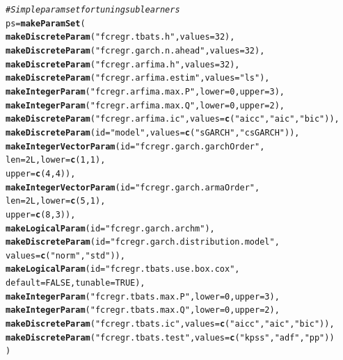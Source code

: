 \documentclass{article}\usepackage[]{graphicx}\usepackage[]{color}
\makeatletter
\newcommand{\hlnum}[1]{\textcolor[rgb]{0.686,0.059,0.569}{#1}}%
\newcommand{\hlstr}[1]{\textcolor[rgb]{0.192,0.494,0.8}{#1}}%
\newcommand{\hlcom}[1]{\textcolor[rgb]{0.678,0.584,0.686}{\textit{#1}}}%
\newcommand{\hlstd}[1]{\textcolor[rgb]{0.345,0.345,0.345}{#1}}%
\newcommand{\hlkwb}[1]{\textcolor[rgb]{0.69,0.353,0.396}{#1}}%
\newcommand{\hlkwc}[1]{\textcolor[rgb]{0.333,0.667,0.333}{#1}}%
\newcommand{\hlkwd}[1]{\textcolor[rgb]{0.737,0.353,0.396}{\textbf{#1}}}%
\newenvironment{kframe}{%
 \def\at@end@of@kframe{}%
 \ifinner\ifhmode%
  \def\at@end@of@kframe{\end{minipage}}%
  \begin{minipage}{\columnwidth}%
 \fi\fi%
 \def\FrameCommand##1{\hskip\@totalleftmargin \hskip-\fboxsep
 \colorbox{shadecolor}{##1}\hskip-\fboxsep
     \hskip-\linewidth \hskip-\@totalleftmargin \hskip\columnwidth}%
 \MakeFramed {\advance\hsize-\width
   \@totalleftmargin\z@ \linewidth\hsize
   \@setminipage}}%
 {\par\unskip\endMakeFramed%
 \at@end@of@kframe}
\newenvironment{knitrout}{}{} %
\theoremstyle{definition}
\makeatother
\begin{document}
\begin{knitrout}
\begin{kframe}
\begin{alltt}
\hlcom{# Simple param set for tuning sub learners}
\hlstd{ps} \hlkwb{=} \hlkwd{makeParamSet}\hlstd{(}
  \hlkwd{makeDiscreteParam}\hlstd{(}\hlstr{"fcregr.tbats.h"}\hlstd{,} \hlkwc{values} \hlstd{=} \hlnum{32}\hlstd{),}
  \hlkwd{makeDiscreteParam}\hlstd{(}\hlstr{"fcregr.garch.n.ahead"}\hlstd{,} \hlkwc{values} \hlstd{=} \hlnum{32}\hlstd{),}
  \hlkwd{makeDiscreteParam}\hlstd{(}\hlstr{"fcregr.arfima.h"}\hlstd{,} \hlkwc{values} \hlstd{=} \hlnum{32}\hlstd{),}
  \hlkwd{makeDiscreteParam}\hlstd{(}\hlstr{"fcregr.arfima.estim"}\hlstd{,} \hlkwc{values} \hlstd{=} \hlstr{"ls"}\hlstd{),}
  \hlkwd{makeIntegerParam}\hlstd{(}\hlstr{"fcregr.arfima.max.P"}\hlstd{,} \hlkwc{lower} \hlstd{=} \hlnum{0}\hlstd{,} \hlkwc{upper} \hlstd{=} \hlnum{3}\hlstd{),}
  \hlkwd{makeIntegerParam}\hlstd{(}\hlstr{"fcregr.arfima.max.Q"}\hlstd{,} \hlkwc{lower} \hlstd{=} \hlnum{0}\hlstd{,} \hlkwc{upper} \hlstd{=} \hlnum{2}\hlstd{),}
  \hlkwd{makeDiscreteParam}\hlstd{(}\hlstr{"fcregr.arfima.ic"}\hlstd{,} \hlkwc{values} \hlstd{=} \hlkwd{c}\hlstd{(}\hlstr{"aicc"}\hlstd{,}\hlstr{"aic"}\hlstd{,}\hlstr{"bic"}\hlstd{)),}
  \hlkwd{makeDiscreteParam}\hlstd{(}\hlkwc{id} \hlstd{=} \hlstr{"model"}\hlstd{,} \hlkwc{values} \hlstd{=} \hlkwd{c}\hlstd{(}\hlstr{"sGARCH"}\hlstd{,} \hlstr{"csGARCH"}\hlstd{)),}
  \hlkwd{makeIntegerVectorParam}\hlstd{(}\hlkwc{id} \hlstd{=} \hlstr{"fcregr.garch.garchOrder"}\hlstd{,}
                         \hlkwc{len} \hlstd{=} \hlnum{2L}\hlstd{,} \hlkwc{lower} \hlstd{=} \hlkwd{c}\hlstd{(}\hlnum{1}\hlstd{,}\hlnum{1}\hlstd{),}
                         \hlkwc{upper} \hlstd{=} \hlkwd{c}\hlstd{(}\hlnum{4}\hlstd{,}\hlnum{4}\hlstd{)),}
  \hlkwd{makeIntegerVectorParam}\hlstd{(}\hlkwc{id} \hlstd{=} \hlstr{"fcregr.garch.armaOrder"}\hlstd{,}
                         \hlkwc{len} \hlstd{=} \hlnum{2L}\hlstd{,} \hlkwc{lower} \hlstd{=} \hlkwd{c}\hlstd{(}\hlnum{5}\hlstd{,}\hlnum{1}\hlstd{),}
                         \hlkwc{upper} \hlstd{=} \hlkwd{c}\hlstd{(}\hlnum{8}\hlstd{,}\hlnum{3}\hlstd{)),}
  \hlkwd{makeLogicalParam}\hlstd{(}\hlkwc{id} \hlstd{=} \hlstr{"fcregr.garch.archm"}\hlstd{),}
  \hlkwd{makeDiscreteParam}\hlstd{(}\hlkwc{id} \hlstd{=} \hlstr{"fcregr.garch.distribution.model"}\hlstd{,}
                    \hlkwc{values} \hlstd{=} \hlkwd{c}\hlstd{(}\hlstr{"norm"}\hlstd{,}\hlstr{"std"}\hlstd{)),}
  \hlkwd{makeLogicalParam}\hlstd{(}\hlkwc{id} \hlstd{=} \hlstr{"fcregr.tbats.use.box.cox"}\hlstd{,}
                                \hlkwc{default} \hlstd{=} \hlnum{FALSE}\hlstd{,}\hlkwc{tunable} \hlstd{=} \hlnum{TRUE}\hlstd{),}
  \hlkwd{makeIntegerParam}\hlstd{(}\hlstr{"fcregr.tbats.max.P"}\hlstd{,} \hlkwc{lower} \hlstd{=} \hlnum{0}\hlstd{,} \hlkwc{upper} \hlstd{=} \hlnum{3}\hlstd{),}
  \hlkwd{makeIntegerParam}\hlstd{(}\hlstr{"fcregr.tbats.max.Q"}\hlstd{,} \hlkwc{lower} \hlstd{=} \hlnum{0}\hlstd{,} \hlkwc{upper} \hlstd{=} \hlnum{2}\hlstd{),}
  \hlkwd{makeDiscreteParam}\hlstd{(}\hlstr{"fcregr.tbats.ic"}\hlstd{,} \hlkwc{values} \hlstd{=} \hlkwd{c}\hlstd{(}\hlstr{"aicc"}\hlstd{,}\hlstr{"aic"}\hlstd{,}\hlstr{"bic"}\hlstd{)),}
  \hlkwd{makeDiscreteParam}\hlstd{(}\hlstr{"fcregr.tbats.test"}\hlstd{,} \hlkwc{values} \hlstd{=} \hlkwd{c}\hlstd{(}\hlstr{"kpss"}\hlstd{,}\hlstr{"adf"}\hlstd{,}\hlstr{"pp"}\hlstd{))}
\hlstd{)}


\end{alltt}
\end{kframe}
\end{knitrout}
\end{document}
